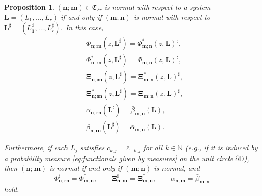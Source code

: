 \documentclass[reqno,centertags,11pt,draft]{amsart}
\newtheorem{prop}[thm]{Proposition}
\newcommand{\N}{\mathbb{N}}
\newcommand{\T}{\mathbb{\partial\mathbb{D}}}
\begin{document}
\begin{prop}\label{thm:reversal vs star polynomials}
    $(\bm{n};\bm{m})\in \mathfrak{C}_{2r}$ %
    is normal with respect to a system $\bm{L}=(L_1,\ldots,L_r)$ if and only if $(\bm{m};\bm{n})$ is normal with respect to $\bm{L}^\sharp =(L_1^\sharp,\ldots,L_r^\sharp)$. In this case,
\begin{align}
\label{eq:symm1}
    &\Phi_{\bm{n};\bm{m}}(z,\bm{L}^\sharp)  = \Phi^*_{\bm{m};\bm{n}}(z,\bm{L}) ^\sharp,
    \\
    \label{eq:symm2}
    &\Phi^*_{\bm{n};\bm{m}}(z,\bm{L}^\sharp) = \Phi_{\bm{m};\bm{n}}(z,\bm{L})^\sharp,
    \\
    \label{eq:symm3}
    &\bm\Xi_{\bm{n};\bm{m}}(z,\bm{L}^\sharp)  = \bm\Xi^*_{\bm{m};\bm{n}}(z,\bm{L}) ^\sharp,
    \\
    \label{eq:symm4}
    &\bm\Xi^*_{\bm{n};\bm{m}}(z,\bm{L}^\sharp) = \bm\Xi_{\bm{m};\bm{n}}(z,\bm{L})^\sharp,
    \\
    \label{eq:symm5}
    &\alpha_{\bm{n};\bm{m}}(\bm{L}^\sharp) = \bar{\beta}_{\bm{m};\bm{n}}(\bm{L}),
    \\
    \label{eq:symm6}
    &\beta_{\bm{n};\bm{m}}(\bm{L}^\sharp) = \bar{\alpha}_{\bm{m};\bm{n}}(\bm{L}).
    \end{align}

    Furthermore, if each $L_j$ satisfies $c_{k,j} = \bar{c}_{-k,j}$ for all $k\in\N$ (e.g., if it is induced by a probability measure \eqref{eq:functionals given by measures} on the unit circle $\T$), then $(\bm{n};\bm{m})$ is normal if and only if $(\bm{m};\bm{n})$ is normal, and 
    \begin{equation}\label{eq:symm7}
        \Phi_{\bm{n};\bm{m}}^\sharp = \Phi_{\bm{m};\bm{n}}^*,
        \qquad
        \bm{\Xi}_{\bm{n};\bm{m}}^\sharp = \bm{\Xi}_{\bm{m};\bm{n}}^*, 
        \qquad 
        \alpha_{\bm{n};\bm{m}} = \bar{\beta}_{\bm{m};\bm{n}}
    \end{equation}
    hold.
\end{prop}
\end{document}
